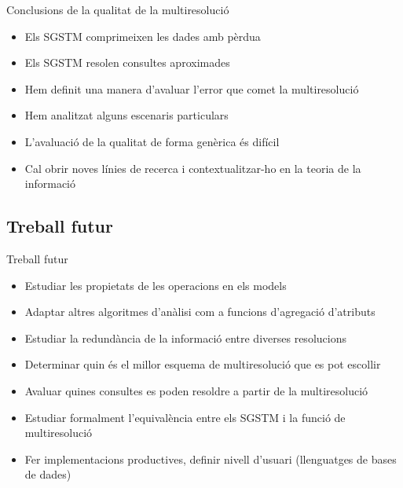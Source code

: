 \begin{frame}{Conclusions de la qualitat de la multiresolució}

  \begin{itemize}
  \item Els SGSTM comprimeixen les dades amb pèrdua
  \item Els SGSTM resolen consultes aproximades
  \item Hem definit una manera d’avaluar l’error que comet la multiresolució
  \item Hem analitzat alguns escenaris particulars
  \item L’avaluació de la qualitat de forma genèrica és difícil
  \item Cal obrir noves línies de recerca i contextualitzar-ho en la teoria de la informació
  \end{itemize}
\end{frame}

\subsection*{Treball futur}
\begin{frame}{Treball futur}

  \begin{itemize}

   \item Estudiar les propietats de les operacions en els models
   \item Adaptar altres algoritmes d'anàlisi com a funcions d'agregació d'atributs
   \item Estudiar la redundància de la informació entre diverses resolucions
   \item Determinar quin és el millor esquema de multiresolució que es pot escollir
   \item Avaluar quines consultes es poden resoldre a partir de la multiresolució
   \item Estudiar formalment l'equivalència  entre els SGSTM i la funció de multiresolució
   \item Fer implementacions productives, definir nivell d’usuari (llenguatges de bases de dades)
  \end{itemize}

\end{frame}



